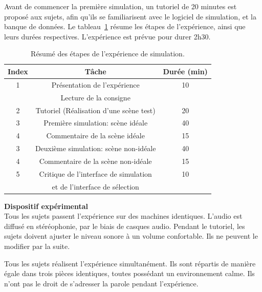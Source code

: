 Avant de commencer la première simulation, un tutoriel de 20 minutes est proposé aux sujets, afin qu'ils se familiarisent avec le logiciel de simulation, et la banque de données. Le tableau~\ref{tab:indSimu} résume les étapes de l’expérience, ainsi que leurs durées respectives. L'expérience est prévue pour durer 2h30. \\

\begin{table}[t]
\centering
\begin{tabular}{c c c} 
Index          & Tâche                               & Durée (min) \\                      
\hline
1 & Présentation de l'expérience                     & 10 \\
  & Lecture de la consigne                           &  \\
\hline
2 & Tutoriel (Réalisation d'une scène test)          & 20 \\
\hline
3 & Première simulation: scène idéale                & 40 \\
\hline
4 & Commentaire de la scène idéale                   & 15 \\
\hline
3 & Deuxième simulation: scène non-idéale            & 40  \\
\hline
4 & Commentaire de la scène non-idéale               & 15 \\
\hline
5 & Critique de l'interface de simulation            & 10 \\
  & et de l'interface de sélection                   & \\
\hline
\end{tabular}
\vspace{0.5mm}
\caption{Résumé des étapes de l’expérience de simulation.}
\label{tab:indSimu}
\end{table}

{\setlength{\parindent}{0cm}\textbf{Dispositif expérimental}} \\

Tous les sujets passent l'expérience sur des machines identiques. L'audio est diffusé en stéréophonie, par le biais de casques audio. Pendant le tutoriel, les sujets doivent ajuster le niveau sonore à un volume confortable. Ils ne peuvent le modifier par la suite.

Tous les sujets réalisent l'expérience simultanément. Ils sont répartis de manière égale dans trois pièces identiques, toutes possédant un environnement calme. Ils n'ont pas le droit de s'adresser la parole pendant l'expérience.

